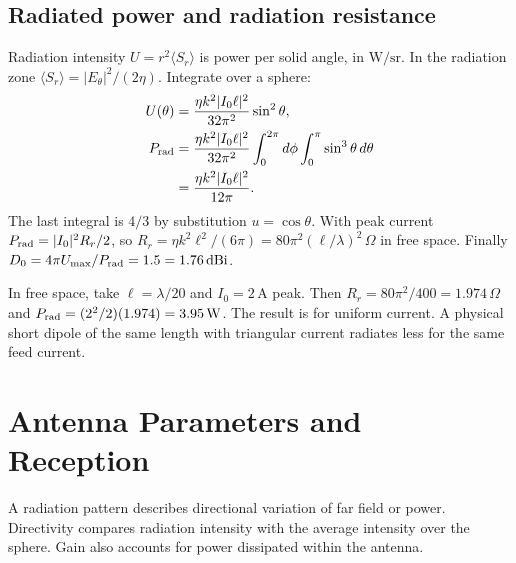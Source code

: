 \documentclass[12pt,a4paper]{article}
\begin{document}
\subsection{Radiated power and radiation resistance}
Radiation intensity $U=r^2\langle S_r\rangle$ is power per solid angle, in $\mathrm{W/sr}$. In the radiation zone $\langle S_r\rangle=|E_\theta|^2/(2\eta)$. Integrate over a sphere:
\[
\begin{aligned}
U(\theta)&=\frac{\eta k^2|I_0\ell|^2}{32\pi^2}\sin^2\theta,\\
P_{\rm rad}&=\frac{\eta k^2|I_0\ell|^2}{32\pi^2}
 \int_0^{2\pi}d\phi\int_0^\pi\sin^3\theta\,d\theta\\
 &=\frac{\eta k^2|I_0\ell|^2}{12\pi}.
\end{aligned}
\]
The last integral is $4/3$ by substitution $u=\cos\theta$. With peak current $P_{\rm rad}=|I_0|^2R_r/2$, so $R_r=\eta k^2\ell^2/(6\pi)=80\pi^2(\ell/\lambda)^2\,\Omega$ in free space. Finally $D_0=4\pi U_{\max}/P_{\rm rad}=1.5=1.76\,\mathrm{dBi}$.
\begin{tcolorbox}[examplebox,title={Power from a current element}]
In free space, take $\ell=\lambda/20$ and $I_0=2\,\mathrm A$ peak. Then $R_r=80\pi^2/400=1.974\,\Omega$ and $P_{\rm rad}=(2^2/2)(1.974)=3.95\,\mathrm W$. The result is for uniform current. A physical short dipole of the same length with triangular current radiates less for the same feed current.
\end{tcolorbox}

\section{Antenna Parameters and Reception}
\begin{tcolorbox}[defbox,title={Radiation pattern and antenna gain}]
A radiation pattern describes directional variation of far field or power. Directivity compares radiation intensity with the average intensity over the sphere. Gain also accounts for power dissipated within the antenna.
\end{tcolorbox}
\end{document}
